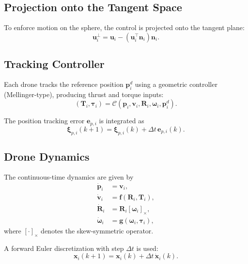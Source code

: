 \documentclass{article}
\begin{document}
\subsection*{Projection onto the Tangent Space}

To enforce motion on the sphere, the control is projected onto the tangent plane:
\[
\bm{u}_i^{\perp} =
\bm{u}_i - (\bm{u}_i^\top \bm{n}_i)\bm{n}_i.
\]

\subsection*{Tracking Controller}

Each drone tracks the reference position $\bm{p}_i^{d}$ using a geometric controller
(Mellinger-type), producing thrust and torque inputs:
\[
(\bm{T}_i, \bm{\tau}_i)
= \mathcal{C}(\bm{p}_i, \bm{v}_i, \bm{R}_i, \bm{\omega}_i,
\bm{p}_i^{d}).
\]

The position tracking error $\bm{e}_{p,i}$ is integrated as
\[
\bm{\xi}_{p,i}(k+1) =
\bm{\xi}_{p,i}(k) + \Delta t\, \bm{e}_{p,i}(k).
\]

\subsection*{Drone Dynamics}

The continuous-time dynamics are given by
\begin{align*}
\dot{\bm{p}}_i &= \bm{v}_i, \\
\dot{\bm{v}}_i &= \bm{f}(\bm{R}_i, \bm{T}_i), \\
\dot{\bm{R}}_i &= \bm{R}_i [\bm{\omega}_i]_\times, \\
\dot{\bm{\omega}}_i &= \bm{g}(\bm{\omega}_i, \bm{\tau}_i),
\end{align*}
where $[\cdot]_\times$ denotes the skew-symmetric operator.

A forward Euler discretization with step $\Delta t$ is used:
\[
\bm{x}_i(k+1) = \bm{x}_i(k) + \Delta t\, \dot{\bm{x}}_i(k).
\]
\end{document}
